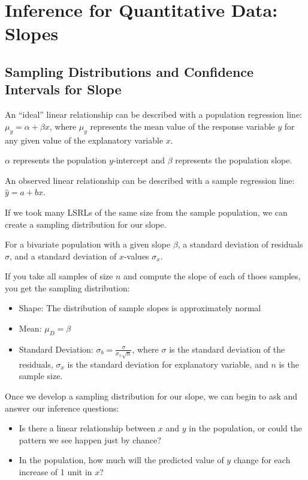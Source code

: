 \documentclass[../stats.tex]{subfiles}
\begin{document}
\chapter{Inference for Quantitative Data: Slopes}
\section{Sampling Distributions and Confidence Intervals for Slope}
An ``ideal'' linear relationship can be described with a population regression line: $\mu_y = \alpha + \beta x$, where $\mu_y$ represents the mean value of the response variable $y$ for any given value of the explanatory variable $x$.

$\alpha$ represents the population $y$-intercept and $\beta$ represents the population slope.

An observed linear relationship can be described with a sample regression line: $\hat{y}=a+bx$.

If we took many LSRLs of the same size from the sample population, we can create a sampling distribution for our slope.

For a bivariate population with a given slope $\beta$, a standard deviation of residuals $\sigma$, and a standard deviation of $x$-values $\sigma_x$.

If you take all samples of size $n$ and compute the slope of each of thoes samples, you get the sampling distribution:
\begin{itemize}
    \item Shape: The distribution of sample slopes is approximately normal 
    \item Mean: $\mu_D = \beta$
    \item Standard Deviation: $\sigma_b = \frac{\sigma}{\sigma_x \sqrt{n}}$, where $\sigma$ is the standard deviation of the residuals, $\sigma_x$ is the standard deviation for explanatory variable, and $n$ is the sample size.
\end{itemize}

Once we develop a sampling distribution for our slope, we can begin to ask and answer our inference questions:
\begin{itemize}
    \item Is there a linear relationship between $x$ and $y$ in the population, or could the pattern we see happen just by chance?
    \item In the population, how much will the predicted value of $y$ change for each increase of 1 unit in $x$?
\end{itemize}
\end{document}
